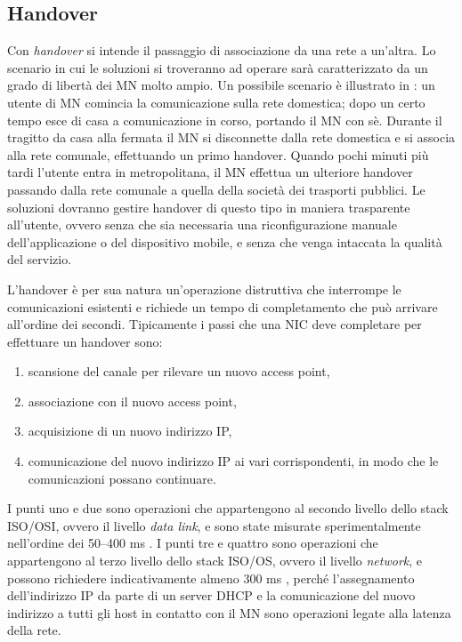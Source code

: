 \documentclass[12pt,a4paper,openright,twoside]{book}
\begin{document}
\subsection{Handover}
Con \emph{handover} si intende il passaggio di associazione da una
rete a un'altra. Lo scenario in cui le soluzioni si troveranno ad
operare sarà caratterizzato da un grado di libertà dei MN molto
ampio. Un possibile scenario è illustrato in \cite{bib:abc}: un utente
di MN comincia la comunicazione sulla rete domestica; dopo un certo
tempo esce di casa a comunicazione in corso, portando il MN con
sè. Durante il tragitto da casa alla fermata il MN si disconnette
dalla rete domestica e si associa alla rete comunale, effettuando un
primo handover. Quando pochi minuti più tardi l'utente entra in
metropolitana, il MN effettua un ulteriore handover passando dalla
rete comunale a quella della società dei trasporti pubblici. Le
soluzioni dovranno gestire handover di questo tipo in maniera
trasparente all'utente, ovvero senza che sia necessaria una
riconfigurazione manuale dell'applicazione o del dispositivo mobile, e
senza che venga intaccata la qualità del servizio.

L'handover è per sua natura un'operazione distruttiva che interrompe
le comunicazioni esistenti e richiede un tempo di completamento che
può arrivare all'ordine dei secondi. Tipicamente i passi che una NIC
deve completare per effettuare un handover sono:
\begin{enumerate}
\item scansione del canale per rilevare un nuovo access point,
\item associazione con il nuovo access point,
\item acquisizione di un nuovo indirizzo IP,
\item comunicazione del nuovo indirizzo IP ai vari corrispondenti, in
  modo che le comunicazioni possano continuare.
\end{enumerate}
I punti uno e due sono operazioni che appartengono al secondo livello
dello stack ISO/OSI, ovvero il livello \emph{data link}, e sono state
misurate sperimentalmente nell'ordine dei 50--400 ms
\cite{bib:misura-handoff-l2}. I punti tre e quattro sono operazioni
che appartengono al terzo livello dello stack ISO/OS, ovvero il
livello \emph{network}, e possono richiedere indicativamente almeno
300 ms \cite{bib:misura-handoff-dhcp}, perché l'assegnamento
dell'indirizzo IP da parte di un server DHCP e la comunicazione del
nuovo indirizzo a tutti gli host in contatto con il MN sono operazioni
legate alla latenza della rete.
\end{document}
